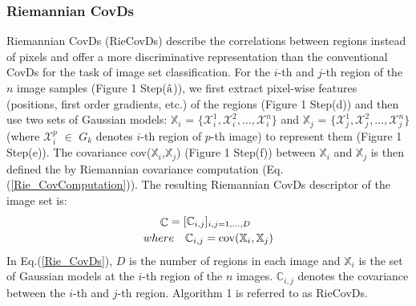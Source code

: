 \documentclass[review]{elsarticle}
\begin{document}
\subsubsection{Riemannian CovDs}
	Riemannian CovDs (RieCovDs) describe the correlations between regions instead of pixels and offer a more discriminative representation than the conventional CovDs for the task of image set classification. For the $i$-th and $j$-th region of the $n$ image samples (Figure 1 Step($\hat{{\rm a}}$)), we first extract pixel-wise features (positions, first order gradients, etc.) of the regions (Figure 1 Step(d)) and then use two sets of Gaussian models:  $\mathbb{X}_i$ =  $\{\mathcal{X}_i^1,$$\mathcal{X}_i^2,$$...,$$\mathcal{X}_i^n \}$ and $\mathbb{X}_j$ =  $\{\mathcal{X}_j^1,$$\mathcal{X}_j^2,$$...,$$\mathcal{X}_j^n \}$ (where $\mathcal{X}_i^p$ $\in$ $G_k$ denotes $i$-th region of $p$-th image) to represent them (Figure 1 Step(e)). The covariance cov($\mathbb{X}_i$,$\mathbb{X}_j$) (Figure 1 Step(f)) between $\mathbb{X}_i$ and $\mathbb{X}_j$ is then defined the  by Riemannian covariance computation ({Eq.(\ref{Rie_CovComputation})}). The resulting Riemannian CovDs descriptor of the image set is:
\begin{equation}
\label{Rie_CovDs}
\begin{split}
\mathop  \mathbb{C} = [\mathbb{C}_{i,j}]{_{i,j=1,...,D}} \quad \quad\\
where \quad  {\mathbb{C}_{i,j}}={\rm cov}(\mathbb{X}_i,\mathbb{X}_j)
\end{split}
\end{equation} 
In {Eq.(\ref{Rie_CovDs})}, $D$ is the number of regions in each image and $\mathbb{X}_i$ is the set of Gaussian models at the $i$-th region of the $n$ images. ${\mathbb{C}_{i,j}}$ denotes the covariance between the $i$-th  and $j$-th region. Algorithm 1 is referred to as RieCovDs.

\end{document}
